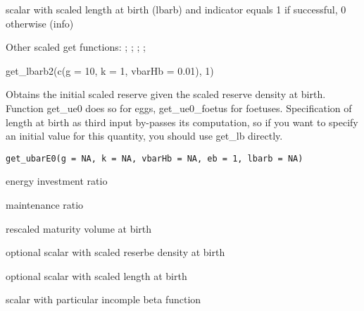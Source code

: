 \documentclass[a4paper]{book}
\begin{document}
%
\begin{Value}
scalar with scaled length at birth (lbarb) and indicator equals 1 if successful, 0 otherwise (info)
\end{Value}
%
\begin{SeeAlso}\relax
Other scaled get functions: ;
; ;
;
\end{SeeAlso}
%
\begin{Examples}
\begin{ExampleCode}
get_lbarb2(c(g = 10, k = 1, vbarHb = 0.01), 1)
\end{ExampleCode}
\end{Examples}
%
\begin{Description}\relax
Obtains the initial scaled reserve given the scaled reserve density at birth.
Function get\_ue0 does so for eggs, get\_ue0\_foetus for foetuses.
Specification of length at birth as third input by-passes its computation,
so if you want to specify an initial value for this quantity, you should use get\_lb directly.
\end{Description}
%
\begin{Usage}
\begin{verbatim}
get_ubarE0(g = NA, k = NA, vbarHb = NA, eb = 1, lbarb = NA)
\end{verbatim}
\end{Usage}
%
\begin{Arguments}
\begin{ldescription}
\item[\code{g}] energy investment ratio

\item[\code{k}] maintenance ratio

\item[\code{vbarHb}] rescaled maturity volume at birth

\item[\code{eb}] optional scalar with scaled reserbe density at birth

\item[\code{lbarb}] optional scalar with scaled length at birth
\end{ldescription}
\end{Arguments}
%
\begin{Value}
scalar with particular incomple beta function
\end{Value}
\end{document}
